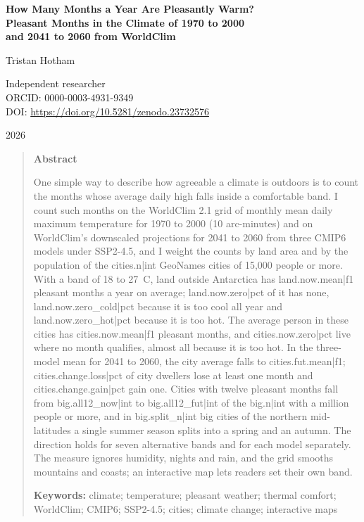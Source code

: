\documentclass[11pt,a4paper]{article}
\begin{document}
\begin{center}
{\Large\bfseries How Many Months a Year Are Pleasantly Warm?\\[2pt] Pleasant Months in the Climate of 1970 to 2000\\[2pt] and 2041 to 2060 from WorldClim\par}
\vspace{1.2em}
{\large Tristan Hotham\par}
\vspace{0.3em}
{\small Independent researcher\\
ORCID: 0000-0003-4931-9349\\
DOI: \href{https://doi.org/10.5281/zenodo.23732576}{https://doi.org/10.5281/zenodo.23732576}\par}
\vspace{0.8em}
2026
\end{center}

\begin{quote}
\small
\begin{center}\textbf{Abstract}\end{center}
One simple way to describe how agreeable a climate is outdoors is to count the months whose average daily high falls inside a comfortable band. I count such months on the WorldClim 2.1 grid of monthly mean daily maximum temperature for 1970 to 2000 (10 arc-minutes) and on WorldClim's downscaled projections for 2041 to 2060 from three CMIP6 models under SSP2-4.5, and I weight the counts by land area and by the population of the {{cities.n|int}} GeoNames cities of 15,000 people or more. With a band of 18 to 27~\textdegree C, land outside Antarctica has {{land.now.mean|f1}} pleasant months a year on average; {{land.now.zero|pct}} of it has none, {{land.now.zero_cold|pct}} because it is too cool all year and {{land.now.zero_hot|pct}} because it is too hot. The average person in these cities has {{cities.now.mean|f1}} pleasant months, and {{cities.now.zero|pct}} live where no month qualifies, almost all because it is too hot. In the three-model mean for 2041 to 2060, the city average falls to {{cities.fut.mean|f1}}; {{cities.change.loss|pct}} of city dwellers lose at least one month and {{cities.change.gain|pct}} gain one. Cities with twelve pleasant months fall from {{big.all12_now|int}} to {{big.all12_fut|int}} of the {{big.n|int}} with a million people or more, and in {{big.split_n|int}} big cities of the northern mid-latitudes a single summer season splits into a spring and an autumn. The direction holds for seven alternative bands and for each model separately. The measure ignores humidity, nights and rain, and the grid smooths mountains and coasts; an interactive map lets readers set their own band.

\textbf{Keywords:} climate; temperature; pleasant weather; thermal comfort; WorldClim; CMIP6; SSP2-4.5; cities; climate change; interactive maps
\end{quote}
\end{document}
